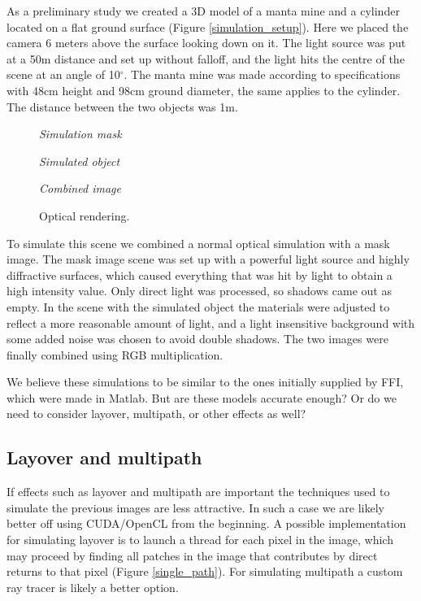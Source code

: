 \documentclass[
   article                                      %
 , 12pt                                         %
 , xelatex                                      %
 , bibtex                                       %
 , layout
]{common/mytemplate}
\begin{document}
As a preliminary study we created a 3D model of a manta mine and a cylinder located on a flat ground surface (Figure  \ref{simulation_setup}). Here we placed the camera 6 meters above the surface looking down on it. The light source was put at a 50\;m distance and set up without falloff, and the light hits the centre of the scene at an angle of 10$^\circ$. The manta mine was made according to specifications with 48\;cm height and 98\;cm ground diameter, the same applies to the cylinder. The distance between the two objects was 1\;m.

\begin{figure}[b]
\begin{minipage}[c]{0.49\linewidth}
\centering\itshape Simulation mask
\end{minipage}\mbox{}\hfill
\begin{minipage}[c]{0.49\linewidth}
\centering\itshape Simulated object
\end{minipage}
\centering\itshape Combined image\vspace{5pt}
\caption{Optical rendering.}\label{s}
\end{figure}

To simulate this scene we combined a normal optical simulation with a mask image. The mask image scene was set up with a powerful light source and highly diffractive surfaces, which caused everything that was hit by light to obtain a high intensity value. Only direct light was processed, so shadows came out as empty. In the scene with the simulated object the materials were adjusted to reflect a more reasonable amount of light, and a light insensitive background with some added noise was chosen to avoid double shadows. The two images were finally combined using RGB multiplication.

We believe these simulations to be similar to the ones initially supplied by FFI, which were made in Matlab. But are these models accurate enough? Or do we need to consider layover, multipath, or other effects as well?


\subsection{Layover and multipath}

If effects such as layover and multipath are important the techniques used to simulate the previous images are less attractive. In such a case we are likely better off using CUDA/OpenCL from the beginning. A possible implementation for simulating layover is to launch a thread for each pixel in the image, which may proceed by finding all patches in the image that contributes by direct returns to that pixel (Figure \ref{single_path}). For simulating multipath a custom ray tracer is likely a better option.
\end{document}
